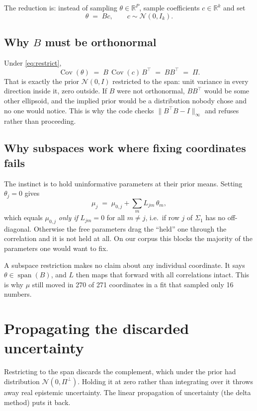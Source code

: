 \documentclass[11pt]{article}
\newcommand{\R}{\mathbb{R}}
\newcommand{\Cov}{\operatorname{Cov}}
\newcommand{\muraw}{\theta}
\newcommand{\Sig}{\Sigma_1}
\begin{document}
The reduction is: instead of sampling $\muraw \in \R^{P}$, sample coefficients
$c \in \R^{k}$ and set
\begin{equation}
  \muraw \;=\; Bc, \qquad c \sim \mathcal N(0, I_k).
  \label{eq:restrict}
\end{equation}

\subsection{Why $B$ must be orthonormal}

Under \eqref{eq:restrict},
\[
  \Cov(\muraw) \;=\; B\,\Cov(c)\,B^{\top} \;=\; BB^{\top} \;=\; \Pi .
\]
That is exactly the prior $\mathcal N(0, I)$ restricted to the span: unit
variance in every direction inside it, zero outside. If $B$ were not
orthonormal, $BB^{\top}$ would be some other ellipsoid, and the implied prior
would be a distribution nobody chose and no one would notice. This is why the
code checks $\|B^{\top}B - I\|_\infty$ and refuses rather than proceeding.

\subsection{Why subspaces work where fixing coordinates fails}

The instinct is to hold uninformative parameters at their prior means. Setting
$\muraw_j = 0$ gives
\[
  \mu_j \;=\; \mu_{0,j} + \sum_{m} L_{jm}\,\muraw_m ,
\]
which equals $\mu_{0,j}$ \emph{only if} $L_{jm} = 0$ for all $m \ne j$, i.e.\ if
row $j$ of $\Sig$ has no off-diagonal. Otherwise the free parameters drag the
``held'' one through the correlation and it is not held at all. On our corpus
this blocks the majority of the parameters one would want to fix.

A subspace restriction makes no claim about any individual coordinate. It says
$\muraw \in \operatorname{span}(B)$, and $L$ then maps that forward with all
correlations intact. This is why $\mu$ still moved in 270 of 271 coordinates in
a fit that sampled only 16 numbers.

\section{Propagating the discarded uncertainty}
\label{sec:prop}

Restricting to the span discards the complement, which under the prior had
distribution $\mathcal N(0, \Pi^{\perp})$. Holding it at zero rather than
integrating over it throws away real epistemic uncertainty. The linear
propagation of uncertainty (the delta method) puts it back.
\end{document}
